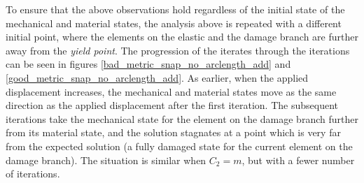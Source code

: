 \documentclass[11pt]{elsarticle}
\begin{document}
To ensure that the above observations hold regardless of the initial state of the mechanical and material states, the analysis above is repeated with a different initial point, where the elements on the elastic and the damage branch are further away from the \textit{yield point}. The progression of the iterates through the iterations can be seen in figures \ref{bad_metric_snap_no_arclength_add} and \ref{good_metric_snap_no_arclength_add}. As earlier, when the applied displacement increases, the mechanical and material states move as the same direction as the applied displacement after the first iteration. The subsequent iterations take the mechanical state for the element on the damage branch further from its material state, and the solution stagnates at a point which is very far from the expected solution (a fully damaged state for the current element on the damage branch). The situation is similar when $C_2=m$, but with a fewer number of iterations.
\end{document}

